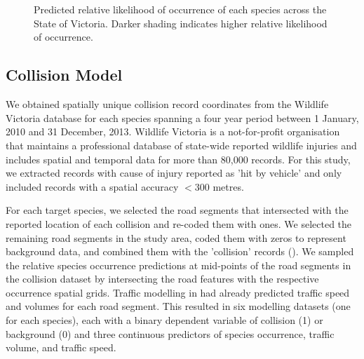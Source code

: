 \begin{figure*}[htp]
  \centering
  \\
  \\  
  \caption[Predicted relative likelihood of six mammal species occurrence in Victoria]{Predicted relative likelihood of occurrence of each species across the State of Victoria. Darker shading indicates higher relative likelihood of occurrence.}
  \label{6sp_occ_preds}
\end{figure*}

\subsection{Collision Model}

We obtained spatially unique collision record coordinates from the Wildlife Victoria database for each species spanning a four year period between 1 January, 2010 and 31 December, 2013. Wildlife Victoria is a not-for-profit organisation that maintains a professional database of state-wide reported wildlife injuries and includes spatial and temporal data for more than 80,000 records.  For this study, we extracted records with cause of injury reported as 'hit by vehicle' and only included records with a spatial accuracy $<$300 metres.

For each target species, we selected the road segments that intersected with the reported location of each collision and re-coded them with ones.  We selected the remaining road segments in the study area, coded them with zeros to represent background data, and combined them with the 'collision' records ().  We sampled the relative species occurrence predictions at mid-points of the road segments in the collision dataset by intersecting the road features with the respective occurrence spatial grids.  Traffic modelling in  had already predicted traffic speed and volumes for each road segment.  This resulted in six modelling datasets (one for each species), each with a binary dependent variable of collision (1) or background (0) and three continuous predictors of species occurrence, traffic volume, and traffic speed.

